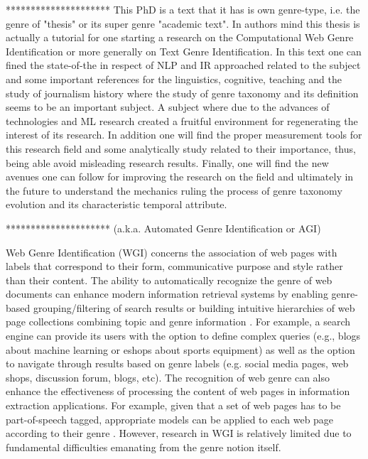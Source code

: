 \documentclass[
    11pt, %
    english, %
    singlespacing, %
    headsepline, %
]{DoctoralThesis} %
\begin{document}
*********************
This PhD is a text that it has is own genre-type, i.e. the genre of "thesis" or its super genre "academic text". In authors mind this thesis is actually a tutorial for one starting a research on the Computational Web Genre Identification or more generally on Text Genre Identification. In this text one can fined the state-of-the in respect of NLP and IR approached related to the subject and some important references for the linguistics, cognitive, teaching and the study of journalism history where the study of genre taxonomy and its definition seems to be an important subject. A subject where due to the advances of technologies and ML research created a fruitful environment for regenerating the interest of its research. In addition one will find the proper measurement tools for this research field and some analytically study related to their importance, thus, being able avoid misleading research results. Finally, one will find the new avenues one can follow for improving the research on the field and ultimately in the future to understand the mechanics ruling the process of genre taxonomy evolution and its characteristic temporal attribute.  

*********************
(a.k.a. Automated Genre Identification or AGI)

Web Genre Identification (WGI) concerns the association of web pages with labels that correspond to their form, communicative purpose and style rather than their content. The ability to automatically recognize the genre of web documents can enhance modern information retrieval systems by enabling genre-based grouping/filtering of search results or building intuitive hierarchies of web page collections combining topic and genre information \parencite{Braslavski2007,Rosso2008,de2009genre}. For example, a search engine can provide its users with the option to define complex queries (e.g., blogs about machine learning or eshops about sports equipment) as well as the option to navigate through results based on genre labels (e.g. social media pages, web shops, discussion forum, blogs, etc). The recognition of web genre can also enhance the effectiveness of processing the content of web pages in information extraction applications. For example, given that a set of web pages has to be part-of-speech tagged, appropriate models can be applied to each web page according to their genre \parencite{Nooralahzadeh2014}. However, research in WGI is relatively limited due to fundamental difficulties emanating from the genre notion itself.
\end{document}
